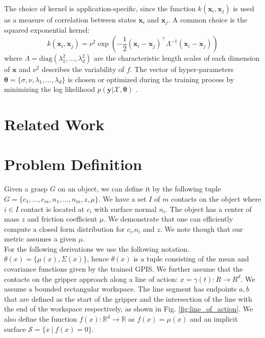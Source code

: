 \documentclass[letterpaper, 10 pt, conference]{ieeeconf}  %
\newcommand{\by}{\mathbf{y}}
\newcommand{\bx}{\mathbf{x}}
\newcommand{\mX}{\mathcal{X}}
\begin{document}
The choice of kernel is application-specific, since the function $k(\bx_i,\bx_j)$ is used as a measure of correlation between states $\bx_i$ and $\bx_j$.
A common choice is the squared exponential kernel:
\begin{equation}
k(\bx_i,\bx_j) 
=
\nu^2\exp(-\frac{1}{2}(\bx_i - \bx_j)^{\intercal}\Lambda^{-1}(\bx_i - \bx_j))
\end{equation}
where $\Lambda= \text{diag}(\lambda_1^2,\ldots,\lambda_d^2)$ are the characteristic length scales of each dimension of $\bx$ and $\nu^2$ describes the variability of $f$.
The vector of hyper-parameters $\boldsymbol{\theta} = \{\sigma,\nu,\lambda_1,\ldots,\lambda_d\}$ is chosen or optimized during the training process by minimizing the log likelihood $p(\by|\mX,\boldsymbol{\theta})$ \cite{rasmussen2006}.

\section{Related Work}

\section{Problem Definition}
Given a grasp $G$ on an object, we can define it by the following tuple $G = \lbrace c_1,...,c_m,n_1,...,n_m,z,\mu\rbrace$. We have a set $I$ of $m$ contacts on the object where $i \in I$ contact is located at $c_i$ with surface normal $n_i$.
The object has a center of mass $z$ and friction coefficient $\mu$.
We demonstrate that one can efficiently compute a closed form distribution for $c_i$,$n_i$ and $z$.
We note though that our metric assumes a given $\mu$. \\

 For the following derivations we use the following notation.
 $\theta(x) = \lbrace \mu(x),\Sigma(x) \rbrace$, hence $\theta(x)$ is a tuple consisting of the mean and covariance functions given by the trained GPIS.
We further assume that the contacts on the gripper approach along a line of action: $x = \gamma(t): R \rightarrow R^d$.
We assume a bounded rectangular workspace.
The line segment has endpoints $a,b$ that are defined as the start of the gripper and the intersection of the line with the end of the workspace respectively, as shown in Fig.
 \ref{fig:line_of_action}.
 We also define the function $f(x): \mathbb{R}^d \rightarrow \mathbb{R}$ as $f(x) = \mu(x)$ and an implicit surface $\mathcal{S} = \{ x \ | \ f(x) = 0 \}$.
\end{document}
